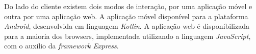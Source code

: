 Do lado do cliente existem dois modos de interação, por uma aplicação móvel e outra por uma aplicação web. A aplicação móvel disponível para a plataforma \textit{Android}, desenvolvida em linguagem \textit{Kotlin}. A aplicação web é disponibilizada para a maioria dos browsers, implementada utilizando a linguagem \textit{JavaScript}, com o auxilio da \textit{framework Express}.












